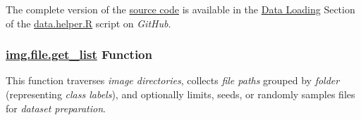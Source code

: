 \documentclass[
]{report}
\newenvironment{Shaded}{\begin{snugshade}}{\end{snugshade}}
\newcommand{\AttributeTok}[1]{\textcolor[rgb]{0.13,0.29,0.53}{#1}}
\newcommand{\CommentTok}[1]{\textcolor[rgb]{0.56,0.35,0.01}{\textit{#1}}}
\newcommand{\DecValTok}[1]{\textcolor[rgb]{0.00,0.00,0.81}{#1}}
\newcommand{\FunctionTok}[1]{\textcolor[rgb]{0.13,0.29,0.53}{\textbf{#1}}}
\newcommand{\NormalTok}[1]{#1}
\newcommand{\OtherTok}[1]{\textcolor[rgb]{0.56,0.35,0.01}{#1}}
\newcommand{\SpecialCharTok}[1]{\textcolor[rgb]{0.81,0.36,0.00}{\textbf{#1}}}
\begin{document}
\begin{Shaded}
\end{Shaded}

\begin{noteblock}
The complete version of the \href{https://github.com/AzKurban-edX-DS/edx.capstone.choose-your-own/blob/main/r/support-functions/data-helper.R\#L80}{source code} is available in the \href{https://github.com/AzKurban-edX-DS/edx.capstone.choose-your-own/blob/main/r/support-functions/data-helper.R\#L-L}{Data Loading} Section of the \href{https://github.com/AzKurban-edX-DS/edx.capstone.choose-your-own/blob/main/r/support-functions/data-helper.R\#L}{data.helper.R} script on \emph{GitHub}.

\end{noteblock}

\newpage

\subsubsection{\texorpdfstring{\href{https://github.com/AzKurban-edX-DS/edx.capstone.choose-your-own/blob/main/r/support-functions/data-helper.R\#L421}{img.file.get\_list} Function}{img.file.get\_list Function}}\label{func.img.file.get_list}

\hfill\break

This function traverses \emph{image directories}, collects \emph{file paths} grouped by \emph{folder} (representing \emph{class labels}), and optionally limits, seeds, or randomly samples files for \emph{dataset preparation}.
\end{document}
